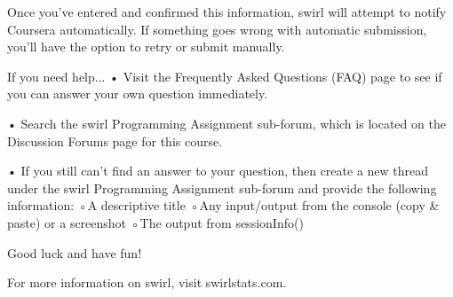 Once you've entered and confirmed this information, swirl will attempt to notify Coursera automatically. If something goes wrong with automatic submission, you'll have the option to retry or submit manually.
 
If you need help...
 •
Visit the Frequently Asked Questions (FAQ) page to see if you can answer your own question immediately.
 
•
Search the swirl Programming Assignment sub-forum, which is located on the Discussion Forums page for this course.
 
•
If you still can't find an answer to your question, then create a new thread under the swirl Programming Assignment sub-forum and provide the following information:
 ◦A descriptive title
 ◦Any input/output from the console (copy & paste) or a screenshot
 ◦The output from sessionInfo()
 

Good luck and have fun!
 
For more information on swirl, visit swirlstats.com.
